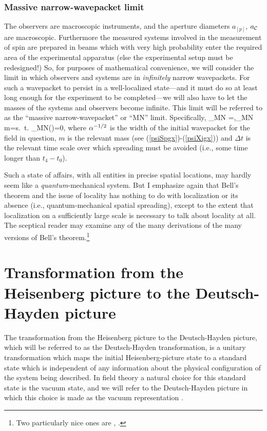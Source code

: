 \documentclass[12pt]{article}
\begin{document}
\subsubsection{Massive narrow-wavepacket limit}\label{SecMNlimit}

The observers are macroscopic instruments, and the aperture diameters $a_{[p]}$\/, $a_\cC$\/ are 
macroscopic. Furthermore the measured systems involved in the measurement of spin
 are prepared in beams which with very high probability
enter the required area of the experimental apparatus (else the experimental setup
must be redesigned!) So,   for purposes of mathematical convenience, we will consider the
limit in which
observers and systems are in {\em infinitely}\/ narrow wavepackets. For such a wavepacket to persist in
a well-localized state---and it must do so at least long enough for the experiment to be 
completed---we will also have to let the masses of the systems and observers become infinite.  
This limit will
be referred to as the ``massive narrow-wavepacket'' or ``MN'' limit.
Specifically,
\be
\lim_{MN} \al =\infty,\;\;\;\lim_{MN} m=\infty\;\;\;\mbox{\rm s. t.}\;\;\; \lim_{MN}\left(\right)=0,
\label{MNlimdef}
\ee
{}
where $\alpha^{-1/2}$\/ is the width of the initial wavepacket for the field in question, $m$\/ is the relevant mass
(see (\ref{psiSpgx})-(\ref{psiXigx})) and $\Delta t$\/ is the relevant time scale over which spreading must be avoided
(i.e., some time longer than $t_4-t_0$\/).


Such a state of affairs, with all entities in precise spatial locations, may hardly seem like a {\em quantum}\/-mechanical
system. But I emphasize again that Bell's theorem and the issue of locality has nothing to do with localization or its absence (i.e., quantum-mechanical
spatial spreading), except
to the extent that localization on a sufficiently large scale is necessary to talk about locality at all.
The sceptical reader may examine any of the many derivations of the many versions of Bell's theorem.\footnote{Two particularly
nice ones are \cite{Mermin90},
\cite{Farris95}.}



\section{Transformation from the Heisenberg picture to the Deutsch-Hayden picture}\label{SecTransformation}

The transformation from the Heisenberg picture to the Deutsch-Hayden picture, which will be referred to as the
Deutsch-Hayden transformation, is a unitary transformation which maps the initial Heisenberg-picture state to a standard state which
is independent of any information about the physical configuration of the system being described. In field theory a natural
choice for this standard state is the vacuum state, and we will refer to the Deutsch-Hayden picture  in which this choice is made as the vacuum representation  
\cite{Rubin02}. 
\end{document}
